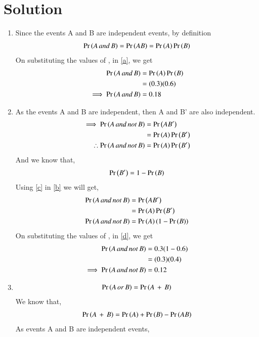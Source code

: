 \documentclass[journal,12pt,twocolumn]{IEEEtran}
\begin{document}
\section{Solution}
\begin{enumerate}[label={\roman*)}]
\item
Since the events A and B are independent events, by definition
\begin{align}
    \Pr\left(A\, and\, B\right) = \Pr\left(AB\right)= \Pr\left(A\right)\Pr\left(B\right)\label{a}
\end{align}
On substituting the values of , in \eqref{a}, we get
\begin{align}
    \Pr\left(A\, and\, B\right) &= \Pr\left(A\right)\Pr\left(B\right)\\
    &= (0.3)(0.6)\\
    \implies \Pr\left(A\, and\, B\right)&=0.18
\end{align}
\item
As the events A and B are independent, then A and B' are also independent.
\begin{align}   
    \implies \Pr\left(A\,and\,not\,B\right) &=\Pr\left(AB'\right)\\
&= \Pr\left(A\right)\Pr\left(B'\right)\\
\therefore \Pr\left(A\,and\,not\,B\right) &= \Pr\left(A\right)\Pr\left(B'\right)\label{b}
\end{align}
And we know that,
\begin{align}
    \Pr\left(B'\right)=1-\Pr\left(B\right)\label{c}
\end{align}
Using \eqref{c} in \eqref{b} we will get,
\begin{align}
   \Pr\left(A\,and\,not\,B\right) &=\Pr\left(AB'\right)\\
&= \Pr\left(A\right)\Pr\left(B'\right)\\
    \Pr\left(A\,and\,not\,B\right) &= \Pr\left(A\right)(1-\Pr\left(B\right))\label{d}
\end{align}
On substituting the values of , in \eqref{d}, we get
\begin{align}
    \Pr\left(A\,and\,not\,B\right) &= 0.3(1-0.6)\\
    &= (0.3)(0.4)\\
    \implies \Pr\left(A\,and\,not\,B\right)&= 0.12
\end{align}
\item
\begin{align}
    \Pr\left(A\,or\,B\right) =\Pr\left(A\,+\,B\right)\label{e}
\end{align}
We know that,
\begin{align}
    \Pr\left(A\,+\,B\right) = \Pr\left(A\right) + \Pr\left(B\right) -\Pr\left(AB\right)\label{f}
\end{align}
As events A and B are independent events,
\begin{align}

\end{align}
\end{enumerate}
\end{document}
